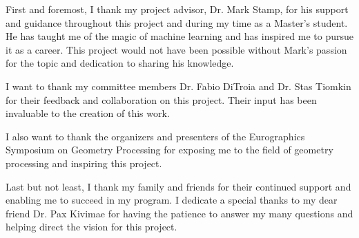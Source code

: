 First and foremost, I thank my project advisor, Dr. Mark Stamp, for his support and guidance throughout this project and during my time as a Master's student. He has taught me of the magic of machine learning and has inspired me to pursue it as a career. This project would not have been possible without Mark's passion for the topic and dedication to sharing his knowledge.

I want to thank my committee members Dr. Fabio DiTroia and Dr. Stas Tiomkin for their feedback and collaboration on this project. Their input has been invaluable to the creation of this work.

I also want to thank the organizers and presenters of the Eurographics Symposium on Geometry Processing for exposing me to the field of geometry processing and inspiring this project.

Last but not least, I thank my family and friends for their continued support and enabling me to succeed in my program. I dedicate a special thanks to my dear friend Dr. Pax Kivimae for having the patience to answer my many questions and helping direct the vision for this project.